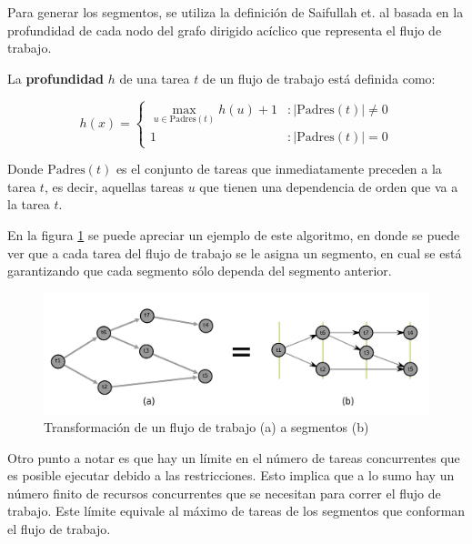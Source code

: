 Para generar los segmentos, se utiliza la definición de Saifullah et. al \cite{saifullah2013multi} basada en la profundidad de cada nodo del grafo dirigido ac\'iclico que representa el flujo de trabajo.

\begin{defn}

La \textbf{profundidad} $h$ de una tarea $t$ de un flujo de trabajo está definida como:

\begin{displaymath}
h(x) = \left\{
     \begin{array}{lr}
       \max_{u \in \text{Padres}(t) } h(u) + 1 & : | \text{Padres}(t) | \neq 0 \\
       1                                       & : | \text{Padres}(t) | = 0
     \end{array}
   \right.
\end{displaymath}

\noindent Donde $\text{Padres}(t)$ es el conjunto de tareas que inmediatamente preceden a la tarea $t$, es decir, aquellas tareas $u$ que tienen una dependencia de orden que va a la tarea $t$.
\end{defn}

En la figura \ref{fig:DAG_to_segment} se puede apreciar un ejemplo de este algoritmo, en donde se puede ver que a cada tarea del flujo de trabajo se le asigna un segmento, en cual se está garantizando que cada segmento sólo dependa del segmento anterior.

\begin{figure}
\begin{center}
\includegraphics[width=1.0\textwidth]{imagenes/DAG_to_segment.pdf}
\end{center}
\caption{Transformación de un flujo de trabajo (a) a segmentos (b)}
\label{fig:DAG_to_segment}
\end{figure}

Otro punto a notar es que hay un límite en el número de tareas concurrentes que es posible ejecutar debido a las restricciones. Esto implica que a lo sumo hay un número finito de recursos concurrentes que se necesitan para correr el flujo de trabajo. Este límite equivale al máximo de tareas de los segmentos que conforman el flujo de trabajo.

